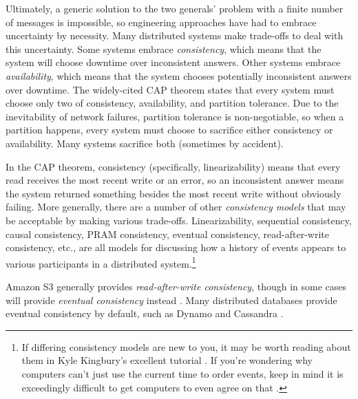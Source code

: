 \documentclass[8pt,fleqn,openany]{book}
\begin{document}
Ultimately, a generic solution to the two generals' problem with a finite number
of messages is impossible, so engineering approaches have had
to embrace uncertainty by necessity. Many distributed systems make trade-offs to
deal with this uncertainty. Some systems embrace {\em consistency}, which means
that the system will choose downtime over inconsistent answers. Other
systems embrace {\em availability}, which means that the system chooses
potentially inconsistent answers over downtime. The widely-cited CAP
theorem \cite{cap1, cap2} states that every system must choose only two of
consistency, availability, and partition tolerance.
Due to the inevitability of network
failures, partition tolerance is non-negotiable, so when a partition happens,
every system must choose to sacrifice either consistency or availability. Many
systems sacrifice both (sometimes by accident).

In the CAP theorem, consistency (specifically, linearizability) means that
every read receives the most recent write or an error, so an inconsistent
answer means the system returned something besides the most recent write
without obviously failing.
More generally, there
are a number of other {\em consistency models} that may be acceptable by making
various trade-offs. Linearizability, sequential consistency, causal consistency,
PRAM consistency, eventual consistency, read-after-write consistency, etc., are
all models for discussing how a history of events appears to various
participants in a distributed system.\footnote{If differing consistency models
are new to you, it may be worth reading about them in Kyle Kingbury's excellent
tutorial \cite{aphyr-consistency}. If you're wondering why computers can't just
use the current time to order events, keep in mind it is exceedingly difficult
to get computers to even agree on that \cite{no-now}.}

Amazon S3 generally provides {\em read-after-write consistency}, though in some
cases will provide {\em eventual consistency} instead \cite{s3-consistency}.
Many distributed databases provide eventual consistency by
default, such as Dynamo \cite{dynamo} and Cassandra \cite{cassandra}.
\end{document}
